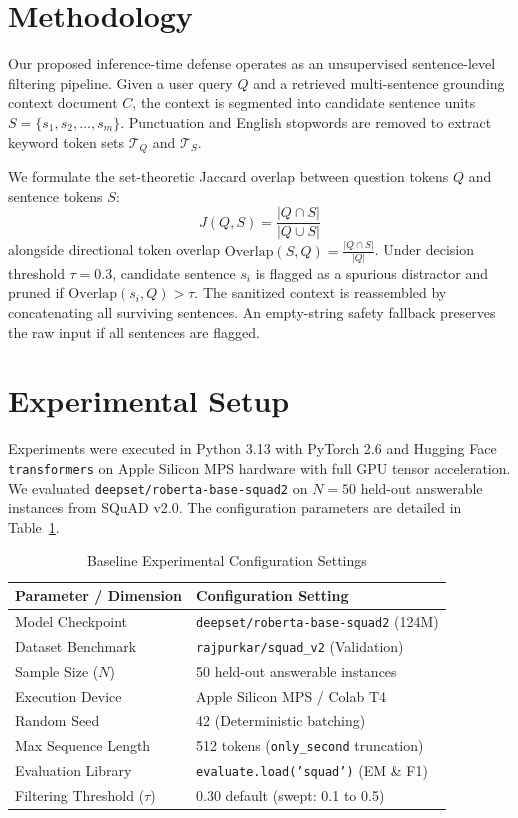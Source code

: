 \documentclass[conference]{IEEEtran}
\begin{document}
\section{Methodology}
Our proposed inference-time defense operates as an unsupervised sentence-level filtering pipeline. Given a user query $Q$ and a retrieved multi-sentence grounding context document $C$, the context is segmented into candidate sentence units $S = \{s_1, s_2, \dots, s_m\}$. Punctuation and English stopwords are removed to extract keyword token sets $\mathcal{T}_Q$ and $\mathcal{T}_S$.

We formulate the set-theoretic Jaccard overlap between question tokens $Q$ and sentence tokens $S$:
\begin{equation}
J(Q, S) = \frac{|Q \cap S|}{|Q \cup S|}
\end{equation}
alongside directional token overlap $\text{Overlap}(S, Q) = \frac{|Q \cap S|}{|Q|}$. Under decision threshold $\tau = 0.3$, candidate sentence $s_i$ is flagged as a spurious distractor and pruned if $\text{Overlap}(s_i, Q) > \tau$. The sanitized context is reassembled by concatenating all surviving sentences. An empty-string safety fallback preserves the raw input if all sentences are flagged.

\section{Experimental Setup}
Experiments were executed in Python 3.13 with PyTorch 2.6 and Hugging Face \texttt{transformers} on Apple Silicon MPS hardware with full GPU tensor acceleration. We evaluated \texttt{deepset/roberta-base-squad2} on $N=50$ held-out answerable instances from SQuAD v2.0. The configuration parameters are detailed in Table~\ref{tab:setup}.

\begin{table}[htbp]
\centering
\caption{Baseline Experimental Configuration Settings}
\label{tab:setup}
\begin{tabular}{ll}
\toprule
\textbf{Parameter / Dimension} & \textbf{Configuration Setting} \\
\midrule
Model Checkpoint & \texttt{deepset/roberta-base-squad2} (124M) \\
Dataset Benchmark & \texttt{rajpurkar/squad\_v2} (Validation) \\
Sample Size ($N$) & 50 held-out answerable instances \\
Execution Device & Apple Silicon MPS / Colab T4 \\
Random Seed & 42 (Deterministic batching) \\
Max Sequence Length & 512 tokens (\texttt{only\_second} truncation) \\
Evaluation Library & \texttt{evaluate.load('squad')} (EM \& F1) \\
Filtering Threshold ($\tau$) & 0.30 default (swept: 0.1 to 0.5) \\
\bottomrule
\end{tabular}
\end{table}
\end{document}
